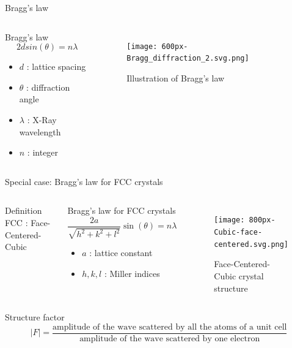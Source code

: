 \documentclass{beamer}
\begin{document}
\begin{frame}{Bragg's law}
    \begin{columns}
        \begin{block}{Bragg's law}
            \begin{equation*}    
                2dsin(\theta) = n \lambda
            \end{equation*}
        \begin{itemize}
            \item $d$ : lattice spacing
            \item $\theta$ : diffraction angle
            \item $\lambda$ : X-Ray wavelength
            \item $n$ : integer
        \end{itemize}
        \end{block}
        \begin{figure}
            \centering
            \texttt{[image: 600px-Bragg\_diffraction\_2.svg.png]}
            \caption{Illustration of Bragg's law}
            \label{fig:BraggLaw}
        \end{figure}
    \end{columns}
\end{frame}

\begin{frame}{Special case: Bragg's law for FCC crystals }
    \begin{columns}
        \begin{exampleblock}{Definition}
            FCC : Face-Centered-Cubic
        \end{exampleblock}
        \begin{block}{Bragg's law for FCC crystals}
            \begin{equation*}
                \frac{2a}{\sqrt{h^2 + k^2 + l^2}} \sin( \theta ) = n \lambda
                \label{eq:Bragg2}
            \end{equation*}
            \begin{itemize}
                \item $a$ : lattice constant
                \item $h,k,l$ : Miller indices
            \end{itemize}
        \end{block}
        \begin{figure}
            \centering
            \texttt{[image: 800px-Cubic-face-centered.svg.png]}
            \caption{Face-Centered-Cubic crystal structure}
            \label{fig:FaceCenteredCubicCrystalStructure}
        \end{figure}
    \end{columns}
    \begin{exampleblock}{Structure factor}
            \[ |F| = \frac{\text{amplitude of the wave scattered by all the atoms of a unit cell}}{\text{amplitude of the wave scattered by one electron}}\]
        \end{exampleblock}
\end{frame}
\end{document}
